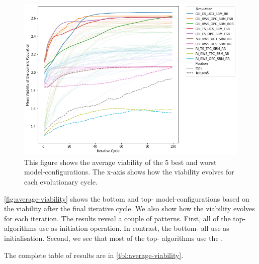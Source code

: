 \documentclass[./../../paper.tex]{subfiles}
\begin{document}
\begin{figure}[htbp]
    \centering
    \includegraphics[width=\textwidth]{figures/generated/exp1_effect_on_viability_top10_last10.png}
    \caption{This figure shows the average viability of the 5 best and worst model-configurations. The x-axis shows how the viability evolves for each evolutionary cycle.}
    \label{fig:average-viability}
\end{figure}

\noindent \autoref{fig:average-viability} shows the bottom and top- model-configurations based on the viability after the final iterative cycle. We also show how the viability evolves for each iteration. The results reveal a couple of patterns. 
First, all of the top- algorithms use  as initiation operation. In contrast, the bottom- all use  as initialisation. 
Second, we see that most of the top- algorithms use the . 

The complete table of results are in \autoref{tbl:average-viability}.

\end{document}
